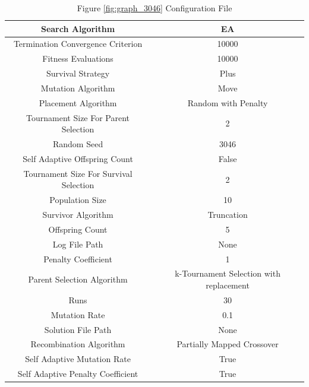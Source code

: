 \documentclass{standalone}
\begin{document}
\begin{table}[!htb]
	\centering
	\caption{Figure \ref{fig:graph_3046} Configuration File}
	\label{tab:graph_3046}
	\begin{tabular}{| c | c |}
		\hline
		Search Algorithm		& EA		 \\
		\hline
		Termination Convergence Criterion		& 10000		 \\
		\hline
		Fitness Evaluations		& 10000		 \\
		\hline
		Survival Strategy		& Plus		 \\
		\hline
		Mutation Algorithm		& Move		 \\
		\hline
		Placement Algorithm		& Random with Penalty		 \\
		\hline
		Tournament Size For Parent Selection		& 2		 \\
		\hline
		Random Seed		& 3046		 \\
		\hline
		Self Adaptive Offspring Count		& False		 \\
		\hline
		Tournament Size For Survival Selection		& 2		 \\
		\hline
		Population Size		& 10		 \\
		\hline
		Survivor Algorithm		& Truncation		 \\
		\hline
		Offspring Count		& 5		 \\
		\hline
		Log File Path		& None		 \\
		\hline
		Penalty Coefficient		& 1		 \\
		\hline
		Parent Selection Algorithm		& k-Tournament Selection with replacement		 \\
		\hline
		Runs		& 30		 \\
		\hline
		Mutation Rate		& 0.1		 \\
		\hline
		Solution File Path		& None		 \\
		\hline
		Recombination Algorithm		& Partially Mapped Crossover		 \\
		\hline
		Self Adaptive Mutation Rate		& True		 \\
		\hline
		Self Adaptive Penalty Coefficient		& True		 \\
		\hline
	\end{tabular}
\end{table}
\end{document}
